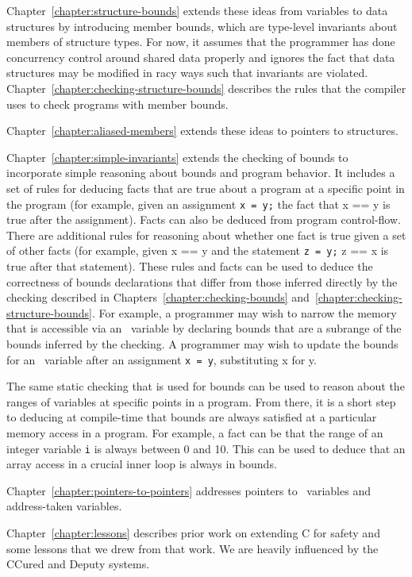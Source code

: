 Chapter~\ref{chapter:structure-bounds} extends these ideas from variables to data 
structures by
introducing member bounds, which are type-level invariants about members
of structure types. For now, it assumes that the programmer has done
concurrency control around shared data properly and ignores the fact
that data structures may be modified in racy ways such that invariants
are violated.  Chapter~\ref{chapter:checking-structure-bounds} describes
the rules that the compiler uses to check programs with member bounds.

Chapter~\ref{chapter:aliased-members} extends these ideas to pointers 
to structures.

Chapter~\ref{chapter:simple-invariants}
extends the checking of bounds to incorporate simple
reasoning about bounds and program behavior. It includes a set of rules
for deducing facts that are true about a program at a specific point in
the program (for example, given an assignment \texttt{x = y;} the fact
that x == y is true after the assignment). Facts can also be deduced
from program control-flow. There are additional rules for reasoning
about whether one fact is true given a set of other facts (for example,
given x == y and the statement \texttt{z = y;} z == x is true after that
statement). These rules and facts can be used to deduce the correctness
of bounds declarations that differ from those inferred directly by the
checking described in Chapters~\ref{chapter:checking-bounds} and~\ref{chapter:checking-structure-bounds}. For example, a programmer
may wish to narrow the memory that is accessible via an
\arrayptr\ variable by declaring bounds that are a subrange of
the bounds inferred by the checking. A programmer may wish to update the
bounds for an \arrayptr\ variable after an assignment \texttt{x
= y}, substituting x for y.

The same static checking that is used for bounds can be used to reason
about the ranges of variables at specific points in a program. From
there, it is a short step to deducing at compile-time that bounds are
always satisfied at a particular memory access in a program. For
example, a fact can be that the range of an integer variable \texttt{i}
is always between 0 and 10. This can be used to deduce that an array
access in a crucial inner loop is always in bounds.

Chapter~\ref{chapter:pointers-to-pointers}
addresses pointers to \arrayptr\ variables and
address-taken variables.

Chapter~\ref{chapter:lessons} describes prior work on extending C for safety and some
lessons that we drew from that work. We are heavily influenced by the
CCured and Deputy systems.

